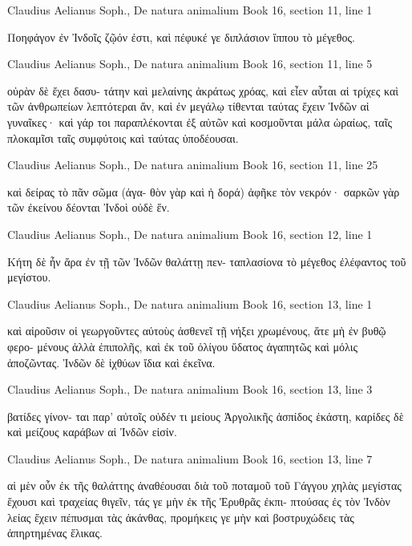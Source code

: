 \documentclass[12pt,letterpaper,twoside,final]{memoir}
\begin{document}
\begin{greek}
Claudius Aelianus Soph., De natura animalium 
Book 16, section 11, line 1

Ποηφάγον ἐν Ἰνδοῖς ζῷόν ἐστι, καὶ πέφυκέ γε 
διπλάσιον ἵππου τὸ μέγεθος. 



Claudius Aelianus Soph., De natura animalium 
Book 16, section 11, line 5

                                 οὐρὰν δὲ ἔχει δασυ-
τάτην καὶ μελαίνης ἀκράτως χρόας, καὶ εἶεν αὗται 
αἱ τρίχες καὶ τῶν ἀνθρωπείων λεπτότεραι ἄν, καὶ ἐν 
μεγάλῳ τίθενται ταύτας ἔχειν Ἰνδῶν αἱ γυναῖκες· 
καὶ γάρ τοι παραπλέκονται ἐξ αὐτῶν καὶ κοσμοῦνται 
μάλα ὡραίως, ταῖς πλοκαμῖσι ταῖς συμφύτοις καὶ 
ταύτας ὑποδέουσαι. 



Claudius Aelianus Soph., De natura animalium 
Book 16, section 11, line 25

                          καὶ δείρας τὸ πᾶν σῶμα (ἀγα-
θὸν γὰρ καὶ ἡ δορά) ἀφῆκε τὸν νεκρόν· σαρκῶν γὰρ 
τῶν ἐκείνου δέονται Ἰνδοὶ οὐδὲ ἕν. 



Claudius Aelianus Soph., De natura animalium 
Book 16, section 12, line 1

Κήτη δὲ ἦν ἄρα ἐν τῇ τῶν Ἰνδῶν θαλάττῃ πεν-
ταπλασίονα τὸ μέγεθος ἐλέφαντος τοῦ μεγίστου. 



Claudius Aelianus Soph., De natura animalium 
Book 16, section 13, line 1

                καὶ αἱροῦσιν οἱ γεωργοῦντες αὐτοὺς 
ἀσθενεῖ τῇ νήξει χρωμένους, ἅτε μὴ ἐν βυθῷ φερο-
μένους ἀλλὰ ἐπιπολῆς, καὶ ἐκ τοῦ ὀλίγου ὕδατος 
ἀγαπητῶς καὶ μόλις ἀποζῶντας. 
 Ἰνδῶν δὲ ἰχθύων ἴδια καὶ ἐκεῖνα. 



Claudius Aelianus Soph., De natura animalium 
Book 16, section 13, line 3

                                             βατίδες γίνον-
ται παρ' αὐτοῖς οὐδέν τι μείους Ἀργολικῆς ἀσπίδος 
ἑκάστη, καρίδες δὲ καὶ μείζους καράβων αἱ Ἰνδῶν 
εἰσίν. 



Claudius Aelianus Soph., De natura animalium 
Book 16, section 13, line 7

         αἱ μὲν οὖν ἐκ τῆς θαλάττης ἀναθέουσαι διὰ 
τοῦ ποταμοῦ τοῦ Γάγγου χηλὰς μεγίστας ἔχουσι καὶ 
τραχείας θιγεῖν, τάς γε μὴν ἐκ τῆς Ἐρυθρᾶς ἐκπι-
πτούσας ἐς τὸν Ἰνδὸν λείας ἔχειν πέπυσμαι τὰς 
ἀκάνθας, προμήκεις γε μὴν καὶ βοστρυχώδεις τὰς 
ἀπηρτημένας ἕλικας. 




\end{greek}
\end{document}
